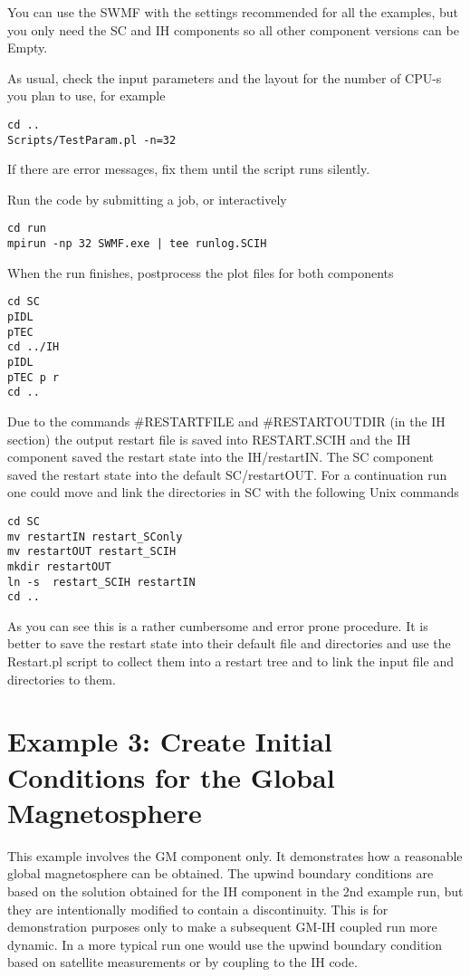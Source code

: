 You can use the SWMF with the settings recommended for all the examples,
but you only need the SC and IH components so 
all other component versions can be Empty.

As usual, check the input parameters and the layout for the
number of CPU-s you plan to use, for example
\begin{verbatim}
cd ..
Scripts/TestParam.pl -n=32
\end{verbatim}
If there are error messages, fix them until the script runs silently.

Run the code by submitting a job, or interactively
\begin{verbatim}
cd run
mpirun -np 32 SWMF.exe | tee runlog.SCIH
\end{verbatim}
When the run finishes, postprocess the plot files for both components
\begin{verbatim}
cd SC
pIDL
pTEC
cd ../IH
pIDL
pTEC p r
cd ..
\end{verbatim}
Due to the commands \#RESTARTFILE and \#RESTARTOUTDIR (in the IH section)
the output restart file is saved into RESTART.SCIH and the IH component
saved the restart state into the IH/restartIN. The SC component saved
the restart state into the default SC/restartOUT. For a continuation run
one could move and link the directories in SC with the following Unix commands
\begin{verbatim}
cd SC
mv restartIN restart_SConly
mv restartOUT restart_SCIH
mkdir restartOUT
ln -s  restart_SCIH restartIN
cd ..
\end{verbatim}
As you can see this is a rather cumbersome and error prone procedure.
It is better to save the restart state into their default file and
directories and use the Restart.pl script to collect them into 
a restart tree and to link the input file and directories to them.

\section{Example 3: Create Initial Conditions for the Global Magnetosphere}

This example involves the GM component only. It demonstrates
how a reasonable global magnetosphere can be obtained.
The upwind boundary conditions are based on the solution obtained
for the IH component in the 2nd example run, but they
are intentionally modified to contain a discontinuity.
This is for demonstration purposes only to make a subsequent
GM-IH coupled run more dynamic. In a more typical run one would
use the upwind boundary condition based on satellite measurements 
or by coupling to the IH code.


